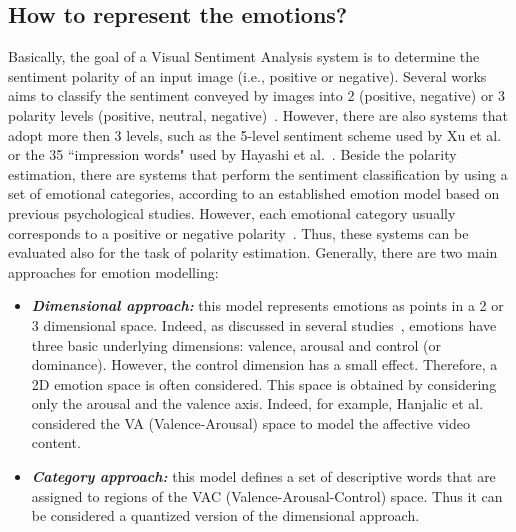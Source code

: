 \subsection{How to represent the emotions?}\label{secEmotionModels}
Basically, the goal of a Visual Sentiment Analysis system is to determine the sentiment polarity of an input image (i.e., positive or negative). Several works aims to classify the sentiment conveyed by images into 2 (positive, negative) or 3 polarity levels (positive, neutral, negative)~\cite{ borth2013large, siersdorfer2010analyzing,you2015robust}. However, there are also systems that adopt more then 3 levels, such as the 5-level sentiment scheme used by Xu et al.~\cite{xu2014visual} or the 35 ``impression words" used by Hayashi et al.~\cite{hayashi1998image}. 
Beside the polarity estimation, there are systems that perform the sentiment classification by using a set of emotional categories, according to an established emotion model based on previous psychological studies. However, each emotional category usually corresponds to a positive or negative polarity~\cite{machajdik2010affective}. Thus, these systems can be evaluated also for the task of polarity estimation.
Generally, there are two main approaches for emotion modelling:
\begin{itemize}
	\item \textit{\textbf{Dimensional approach:}} this model represents emotions as points in a 2 or 3 dimensional space. %
	Indeed, as discussed in several studies~\cite{bradley1994emotional, lang1993network, osgood1952nature, russell1977evidence}, emotions have three basic underlying dimensions: valence, arousal and control (or dominance). %
	However, %
	the control dimension has a small effect. Therefore, a 2D emotion space is often considered. This space is obtained by considering only the arousal and the valence axis. %
	Indeed, for example, Hanjalic et al.~\cite{hanjalic2005affective} considered the VA (Valence-Arousal) space to model the affective video content.
	
	\item \textit{\textbf{Category approach:}} this model defines a set of descriptive words that are assigned to regions of the VAC (Valence-Arousal-Control) space. Thus it can be considered a quantized version of the dimensional approach.
\end{itemize}

